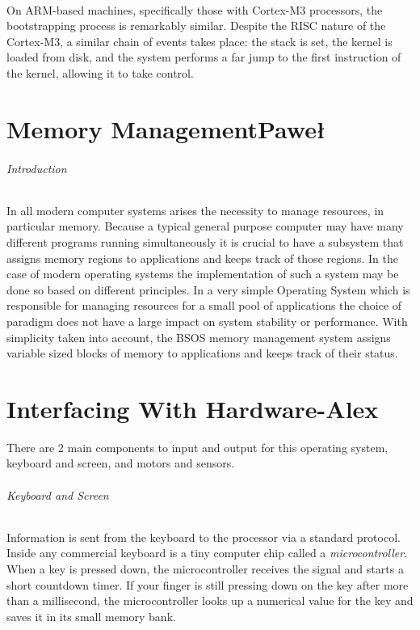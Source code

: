 \documentclass[english]{paper}
\begin{document}
\paragraph{}
On ARM-based machines, specifically those with Cortex-M3 processors, the bootstrapping process is remarkably similar. Despite the RISC nature of the Cortex-M3, a similar chain of events takes place: the stack is set, the kernel is loaded from disk, and the system performs a far jump to the first instruction of the kernel, allowing it to take control.

\part{Memory ManagementPawe\l{}}

\paragraph{Introduction}
In all modern computer systems arises the necessity to manage resources, in particular memory. Because a typical general purpose computer
may have many different programs running simultaneously it is crucial to have a subsystem that assigns memory regions to applications and keeps
track of those regions. In the case of modern operating systems the implementation of such a system may be done so based on different principles.
In a very simple Operating System which is responsible for managing resources for a small pool of applications the choice of paradigm does not have a large impact on system stability or performance.
With simplicity taken into account, the BSOS memory management system assigns variable sized blocks of memory to applications and keeps track of their status.


\part{Interfacing With Hardware-Alex}
There are 2 main components to input and output for this operating system, keyboard and screen, and motors and sensors.
\paragraph{Keyboard and Screen}
Information is sent from the keyboard to the processor via a standard protocol. Inside any commercial keyboard is a tiny computer chip
called a {\it microcontroller}. When a key is pressed down, the microcontroller receives the signal and starts a short countdown timer. If your finger is still pressing down on the key after more than a millisecond, the microcontroller looks up a numerical value for the key
and saves it in its small memory bank.
\end{document}
